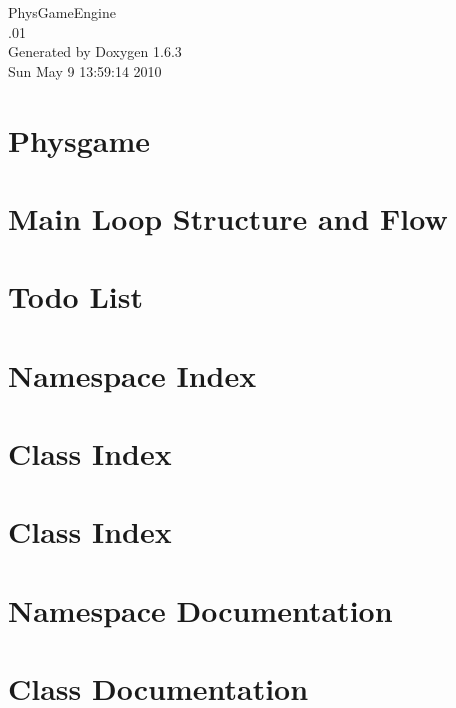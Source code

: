 \documentclass[a4paper]{book}
\begin{document}
\hypersetup{pageanchor=false}
\begin{titlepage}
\vspace*{7cm}
\begin{center}
{\Large PhysGameEngine \\[1ex]\large .01 }\\
\vspace*{1cm}
{\large Generated by Doxygen 1.6.3}\\
\vspace*{0.5cm}
{\small Sun May 9 13:59:14 2010}\\
\end{center}
\end{titlepage}
\clearemptydoublepage
{}
\tableofcontents
\clearemptydoublepage
{}
\hypersetup{pageanchor=true}
\chapter{Physgame}
\label{index}\hypertarget{index}{}
\chapter{Main Loop Structure and Flow}
\label{mainloop1}
\hypertarget{mainloop1}{}

\chapter{Todo List}
\label{todo}
\hypertarget{todo}{}

\chapter{Namespace Index}

\chapter{Class Index}

\chapter{Class Index}

\chapter{Namespace Documentation}

\chapter{Class Documentation}















\printindex
\end{document}
